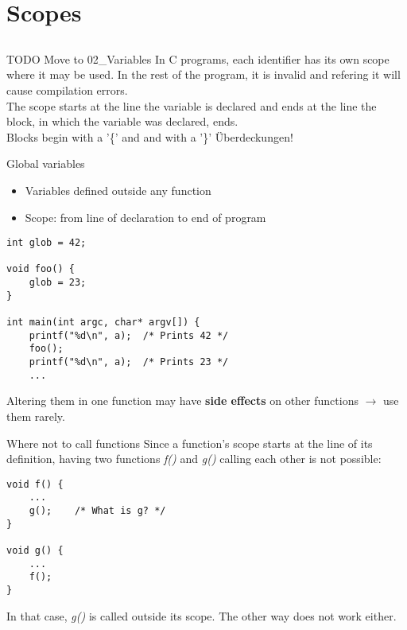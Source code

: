 \section{Scopes}
\subsection{}
\begin{frame}{TODO Move to 02\_Variables}
	In C programs, each identifier has its own scope where it may be used. In the rest of the program, it is invalid and refering it will cause compilation errors. \\
	The scope starts at the line the variable is declared and ends at the line the block, in which the variable was declared, ends. \\
	Blocks begin with a '\{' and and with a '\}'
	Überdeckungen!
\end{frame}
\begin{frame}[fragile]{Global variables}
	\begin{itemize}
		\item Variables defined outside any function
		\item Scope: from line of declaration to end of program
	\end{itemize}
	\begin{lstlisting}
int glob = 42;

void foo() {
	glob = 23;
}

int main(int argc, char* argv[]) {
	printf("%d\n", a);	/* Prints 42 */
	foo();
	printf("%d\n", a);	/* Prints 23 */
	...
\end{lstlisting}
	Altering them in one function may have \textbf{side effects} on other functions $\rightarrow$ use them rarely.
\end{frame}
\begin{frame}[fragile]{Where not to call functions}
	Since a function's scope starts at the line of its definition, having two functions \textit{f()} and \textit{g()} calling each other is not possible:
	\begin{lstlisting}
void f() {
	...
	g();	/* What is g? */
}

void g() {
	...
	f();
}
\end{lstlisting}
	In that case, \textit{g()} is called outside its scope. The other way does not work either.
\end{frame}
